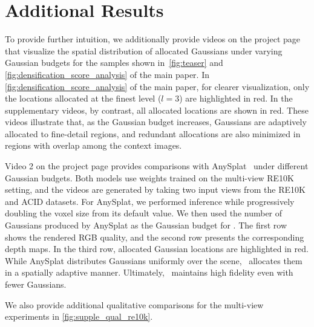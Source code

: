 \section{Additional Results}

 To provide further intuition, we additionally provide videos on the project page that visualize the spatial distribution of allocated Gaussians under varying Gaussian budgets for the samples shown in~\cref{fig:teaser} and \cref{fig:densification_score_analysis} of the main paper. In \cref{fig:densification_score_analysis} of the main paper, for clearer visualization, only the locations allocated at the finest level ($l=3$) are highlighted in red. In the supplementary videos, by contrast, all allocated locations are shown in red. These videos illustrate that, as the Gaussian budget increases, Gaussians are adaptively allocated to fine-detail regions, and redundant allocations are also minimized in regions with overlap among the context images.

 Video 2 on the project page provides comparisons with AnySplat~\cite{jiang2025anysplat} under different Gaussian budgets. Both models use weights trained on the multi-view RE10K setting, and the videos are generated by taking two input views from the RE10K and ACID datasets. For AnySplat, we performed inference while progressively doubling the voxel size from its default value. We then used the number of Gaussians produced by AnySplat as the Gaussian budget for \OURMODEL. The first row shows the rendered RGB quality, and the second row presents the corresponding depth maps. In the third row, allocated Gaussian locations are highlighted in red. While AnySplat distributes Gaussians uniformly over the scene, \OURMODEL\ allocates them in a spatially adaptive manner. Ultimately, \OURMODEL\ maintains high fidelity even with fewer Gaussians.


 We also provide additional qualitative comparisons for the multi-view experiments in \cref{fig:supple_qual_re10k}.